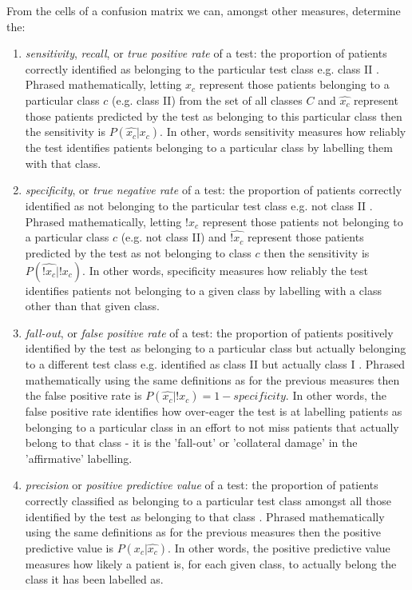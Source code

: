 \documentclass[]{article}
\begin{document}
From the cells of a confusion matrix we can, amongst other measures, determine the:
\begin{enumerate}[label=\alph*)]
	\item \textit{sensitivity}, \textit{recall}, or \textit{true positive rate} of a test: the proportion of patients correctly identified as belonging to the particular test class e.g. class II \cite{Flach2004,MedCalc2017,Gung2013,Sokolova2009,Forman2010,VanAsch2013}. Phrased mathematically, letting $x_c$ represent those patients belonging to a particular class $c$ (e.g. class II) from the set of all classes $C$ and $\hat{x_c}$ represent those patients predicted by the test as belonging to this particular class then the sensitivity is $P(\hat{x_c}|x_c)$. In other, words sensitivity measures how reliably the test identifies patients belonging to a particular class by labelling them with that class. 
	\item \textit{specificity}, or \textit{true negative rate} of a test: the proportion of patients correctly identified as not belonging to the particular test class e.g. not class II \cite{Flach2004,MedCalc2017,Gung2013,Sokolova2009,Forman2010,VanAsch2013}. Phrased mathematically, letting $!x_c$ represent those patients not belonging to a particular class $c$ (e.g. not class II) and $\hat{!x_c}$ represent those patients predicted by the test as not belonging to class $c$ then the sensitivity is $P(\hat{!x_c}|!x_c)$. In other words, specificity measures how reliably the test identifies patients not belonging to a given class by labelling with a class other than that given class.
	\item \textit{fall-out}, or \textit{false positive rate} of a test: the proportion of patients positively identified by the test as belonging to a particular class but actually belonging to a different test class e.g. identified as class II but actually class I \cite{Flach2004,MedCalc2017,Sokolova2009,Forman2010,VanAsch2013}. Phrased mathematically using the same definitions as for the previous measures then the false positive rate is $P(\hat{x_c}|!x_c) = 1 - \textit{specificity}$. In other words, the false positive rate identifies how over-eager the test is at labelling patients as belonging to a particular class in an effort to not miss patients that actually belong to that class - it is the 'fall-out' or 'collateral damage' in the 'affirmative' labelling.
	\item \textit{precision} or \textit{positive predictive value} of a test: the proportion of patients correctly classified as belonging to a particular test class amongst all those identified by the test as belonging to that class \cite{Flach2004,Gung2013,Sokolova2009,Forman2010,VanAsch2013}. Phrased mathematically using the same definitions as for the previous measures then the positive predictive value is $P(x_c|\hat{x_c})$. In other words, the positive predictive value measures how likely a patient is, for each given class, to actually belong the class it has been labelled as.

\end{enumerate}
\end{document}
